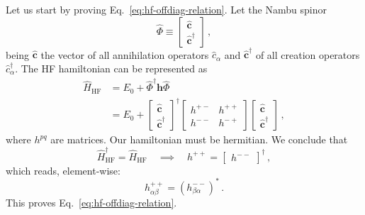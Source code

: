 \begin{tabproof}
	
	Let us start by proving Eq.~\eqref{eq:hf-offdiag-relation}. Let the Nambu spinor
	\[
	\hat \Phi \equiv \begin{bmatrix}
		\hat{\mathbf{c}} \\ \hat{\mathbf{c}}^\dagger
	\end{bmatrix} \, ,
	\]
	being $\hat{\mathbf{c}}$ the vector of all annihilation operators $\hat c_\alpha$ and $\hat{\mathbf{c}}^\dagger$ of all creation operators $\hat c_\alpha^\dagger$. The HF hamiltonian can be represented as
	\[
	\begin{aligned}
		\hat H_\mathrm{HF} &= E_0 + \hat \Phi^\dagger \mathbf{h} \hat \Phi \\
		&= E_0 + \begin{bmatrix}
			\hat{\mathbf{c}} \\ \hat{\mathbf{c}}^\dagger
		\end{bmatrix}^\dagger \begin{bmatrix}
			h^{+-} & h^{++} \\
			h^{--} & h^{-+}
		\end{bmatrix} \begin{bmatrix}
		\hat{\mathbf{c}} \\ \hat{\mathbf{c}}^\dagger
		\end{bmatrix} \, ,
	\end{aligned}
	\]
	where $h^{pq}$ are matrices. Our hamiltonian must be hermitian. We conclude that
	\[
		\hat H_\mathrm{HF}^\dagger = \hat H_\mathrm{HF}
		\quad\implies\quad
		h^{++} = \begin{bmatrix}
			h^{--}
		\end{bmatrix}^\dagger \, ,
	\]
	which reads, element-wise:
	\[
		h_{\alpha\beta}^{++} = \left(h_{\beta\alpha}^{--}\right)^* \, .
	\]
	This proves Eq.~\eqref{eq:hf-offdiag-relation}.
	

\end{tabproof}
